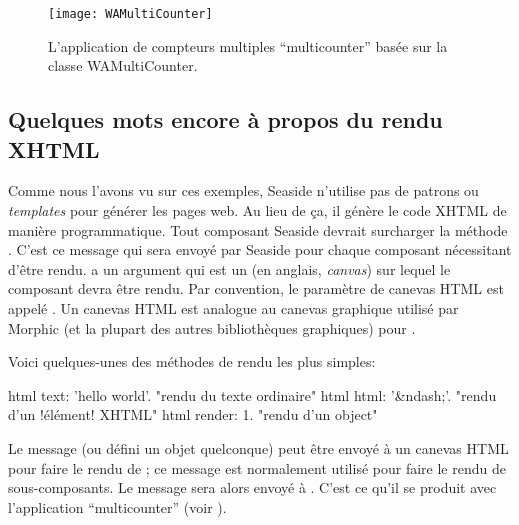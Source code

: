 \documentclass[a4paper,10pt,twoside]{book}
\begin{document}
\begin{figure}[bht]
\begin{center}
\texttt{[image: WAMultiCounter]}
\caption{L'application de compteurs multiples ``multicounter'' basée
  sur la classe WAMultiCounter.}
\end{center}
\end{figure}

\subsection{Quelques mots encore à propos du rendu XHTML}

Comme nous l'avons vu sur ces exemples, Seaside n'utilise pas de
patrons ou \emph{templates} pour générer les pages web.
Au lieu de ça, il génère le code XHTML de manière programmatique.
Tout composant Seaside devrait surcharger la méthode
 . C'est ce message qui sera
 envoyé par Seaside pour chaque composant nécessitant d'être rendu.
  a un argument qui est un
  
 (en anglais, \emph{canvas}) 
sur lequel le composant devra être rendu.
Par convention, le paramètre de canevas HTML est appelé 
 .
Un canevas HTML est analogue au canevas graphique utilisé par Morphic
(et la plupart des autres bibliothèques graphiques) pour
.
 
Voici quelques-unes des méthodes de rendu les plus simples:
\begin{code}{}
html text: 'hello world'.  "rendu du texte ordinaire"
html html: '&ndash;'.     "rendu d'un !élément! XHTML"
html render: 1.              "rendu d'un object"
\end{code}

Le message  
(ou  défini un objet quelconque)
peut être envoyé à un canevas HTML pour faire le rendu de ; 
ce message est normalement utilisé pour faire le rendu de sous-composants.
Le message  sera alors envoyé à .
C'est ce qu'il se produit avec l'application ``multicounter''
 (voir ).
\end{document}
